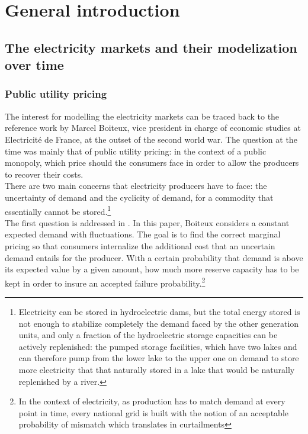 \renewcommand{\thesection}{\arabic{chapter}.\arabic{section}}

\chapter*{General introduction}
\label{chap:intro}
\cleardoublepage
\doublespacing

\section*{The electricity markets and their modelization over time}
\subsection*{Public utility pricing}

The interest for modelling the electricity markets can be traced back to the reference work by Marcel Boiteux, vice president in charge of economic studies at Electricité de France, at the outset of the second world war. The question at the time was mainly that of public utility pricing: in the context of a public monopoly, which price should the consumers face in order to allow the producers to recover their costs. \\

There are two main concerns that electricity producers have to face: the uncertainty of demand and the cyclicity of demand, for a commodity that essentially cannot be stored.\footnote{Electricity can be stored in hydroelectric dams, but the total energy stored is not enough to stabilize completely the demand faced by the other generation units, and only a fraction of the hydroelectric storage capacities can be actively replenished: the pumped storage facilities, which have two lakes and can therefore pump from the lower lake to the upper one on demand to store more electricity that that naturally stored in a lake that would be naturally replenished by a river.} \\

The first question is addressed in \cite{boiteux1951tarification}. In this paper, Boiteux considers a constant expected demand with fluctuations. The goal is to find the correct marginal pricing so that consumers internalize the additional cost that an uncertain demand entails for the producer. With a certain probability that demand is above its expected value by a given amount, how much more reserve capacity has to be kept in order to insure an accepted failure probability.\footnote{In the context of electricity, as production has to match demand at every point in time, every national grid is built with the notion of an acceptable probability of mismatch which translates in curtailments}\\

